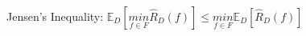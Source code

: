 Jensen's Inequality: $\mathbb{E}_D\left[\underset{f\in F}{min} \hat{R}_D(f)\right] \leq \underset{f\in F}{min}\mathbb{E}_D\left[\hat{R}_D(f)\right]$


